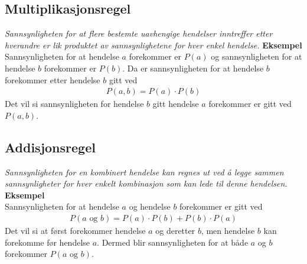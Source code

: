 \documentclass[main.tex]{subfiles}
\begin{document}
\subsection*{Multiplikasjonsregel}
\emph{Sannsynligheten for at flere bestemte uavhengige hendelser inntreffer etter hverandre er lik produktet av 
sannsynlighetene for hver enkel hendelse.}\newline\newline
\textbf{Eksempel}\\
Sannsynligheten for at hendelse $a$ forekommer er $P(a)$ og sannsynligheten for at hendelse $b$ forekommer er
$P(b)$. Da er sannsynligheten for at hendelse $b$ forekommer etter hendelse $b$ gitt ved
\begin{align*}
P(a,b) = P(a)\cdot P(b)
\end{align*}
Det vil si sannsynligheten for hendelse $b$ gitt hendelse $a$ forekommer er gitt ved $P(a,b)$.
\subsection*{Addisjonsregel}
\emph{Sannsynligheten for en kombinert hendelse kan regnes ut ved å legge sammen sannsynligheter for hver enkelt kombinasjon som kan lede til denne hendelsen.}\newline\newline
\textbf{Eksempel}\\
Sannsynligheten for at hendelse $a$ og hendelse $b$ forekommer er gitt ved
\begin{align*}
P(a \text{ og } b) = P(a)\cdot P(b) + P(b)\cdot P(a)
\end{align*}
Det vil si at først forekommer hendelse $a$ og deretter $b$, men hendelse $b$ kan forekomme før hendelse $a$.
Dermed blir sannsynligheten for at både $a$ og $b$ forekommer $P(a \text{ og } b)$.
\end{document}
